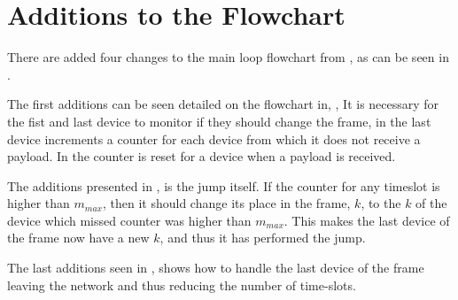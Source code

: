 \section{Additions to the Flowchart}
There are added four changes to the main loop flowchart from , as can be seen in .



The first additions can be seen detailed on the flowchart in, ,
It is necessary for the fist and last device to monitor if they should change the frame, in  the last device increments a counter for each device from which it does not receive a payload.
In  the counter is reset for a device when a payload is received.


The additions presented in , is the jump itself.
If the counter for any timeslot is higher than $m_{max}$, then it should change its place in the frame, $k$, to the $k$ of the device which missed counter was higher than $m_{max}$.
This makes the last device of the frame now have a new $k$, and thus it has performed the jump.	

The last additions seen in , shows how to handle the last device of the frame leaving the network and thus reducing the number of time-slots.
